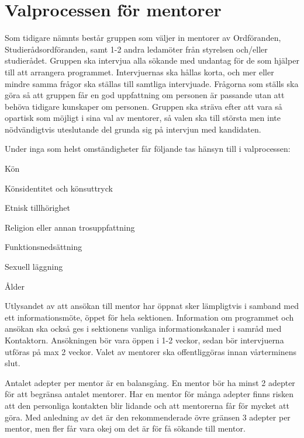 \documentclass[10pt]{article}
\begin{document}
    \newpage

    \section{Valprocessen för mentorer}
    Som tidigare nämnts består gruppen som väljer in mentorer av Ordföranden, Studierådsordföranden, samt 1-2 andra ledamöter från styrelsen och/eller studierådet.
    Gruppen ska intervjua alla sökande med undantag för de som hjälper till att arrangera programmet.
    Intervjuernas ska hållas korta, och mer eller mindre samma frågor ska ställas till samtliga intervjuade.
    Frågorna som ställs ska göra så att gruppen får en god uppfattning om personen är passande utan att behöva tidigare kunskaper om personen.
    Gruppen ska sträva efter att vara så opartisk som möjligt i sina val av mentorer, så valen ska till största men inte nödvändigtvis uteslutande del grunda sig på intervjun med kandidaten.

    Under inga som helst omständigheter får följande tas hänsyn till i valprocessen:
    \begin{dashlist}
        \item Kön
        \item Könsidentitet och könsuttryck
        \item Etnisk tillhörighet
        \item Religion eller annan trosuppfattning
        \item Funktionsnedsättning
        \item Sexuell läggning
        \item Ålder
    \end{dashlist}

    Utlysandet av att ansökan till mentor har öppnat sker lämpligtvis i samband med ett informationsmöte, öppet för hela sektionen.
    Information om programmet och ansökan ska också ges i sektionens vanliga informationskanaler i samråd med Kontaktorn.
    Ansökningen bör vara öppen i 1-2 veckor, sedan bör intervjuerna utföras på max 2 veckor.
    Valet av mentorer ska offentliggöras innan vårterminens slut.

    Antalet adepter per mentor är en balansgång.
    En mentor bör ha minst 2 adepter för att begränsa antalet mentorer.
    Har en mentor för många adepter finns risken att den personliga kontakten blir lidande och att mentorerna får för mycket att göra.
    Med anledning av det är den rekommenderade övre gränsen 3 adepter per mentor, men fler får vara okej om det är för få sökande till mentor.
\end{document}
